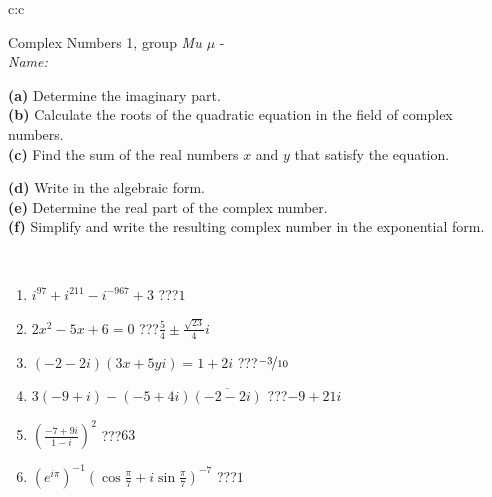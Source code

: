 \documentclass[10pt]{report}
\begin{document}
\begin{tabular}{c:c}
\begin{minipage}[c][104.5mm][t]{0.5\linewidth}
\begin{center}
{\huge Complex Numbers 1, group \textit{Mu $\mu$} -}\\[5mm]
\textit{Name:}\phantom{xxxxxxxxxxxxxxxxxxxxxxxxxxxxxxxxxxxxxxxxxxxxxxxxxxxxxxxxxxxxxxxxx}\\[5mm]
\begin{minipage}{0.95\linewidth}
\begin{center}
{\small \begin{minipage}{0.44\textwidth} \raggedright
\textbf{(a)} Determine the imaginary part. \\[1mm]
\textbf{(b)} Calculate the roots of the quadratic equation in the field of complex numbers. \\[1mm]
\textbf{(c)} Find the sum of the real numbers \(x\) and \(y\) that satisfy the equation. \end{minipage} \begin{minipage}{0.54\textwidth}
\textbf{(d)} Write in the algebraic form. \\[1mm]
\textbf{(e)} Determine the real part of the complex number. \\[1mm]
\textbf{(f)} Simplify and write the resulting complex number in the exponential form.
\end{minipage}
} \vspace{3mm}
\end{center}
\end{minipage}
\\[1mm]
\begin{minipage}{0.79\linewidth}
\begin{center}
\begin{varwidth}{\linewidth}
\setlength{\itemsep}{0pt}
\begin{enumerate}
\large
\item $i^{97}+i^{211}-i^{-967}+3$\quad \dotfill\; ???\;\dotfill \quad $1$
\item $2x^2-5x+6=0$\quad \dotfill\; ???\;\dotfill \quad $\frac{5}{4} \pm{}\frac{ \sqrt{23}}{4}i$
\item $(-2-2i)(3x+5yi)=1+2i$\quad \dotfill\; ???\;\dotfill \quad $\nicefrac{-3}{10}$
\item $3(-9+i)-(-5+4i)\overline{(-2-2i)}$\quad \dotfill\; ???\;\dotfill \quad $-9+21i$
\item $\left(\frac{-7+9i}{1-i}\right)^2$\quad \dotfill\; ???\;\dotfill \quad $63$
\item $\left(e^{i\pi}\right)^{-1}\left(\cos{\frac{\pi}{7}}+i\sin{\frac{\pi}{7}}\right)^{-7}$\quad \dotfill\; ???\;\dotfill \quad $1$
\end{enumerate}

\end{varwidth}
\end{center}
\end{minipage}
\end{center}
\end{minipage}
\end{tabular}
\end{document}
